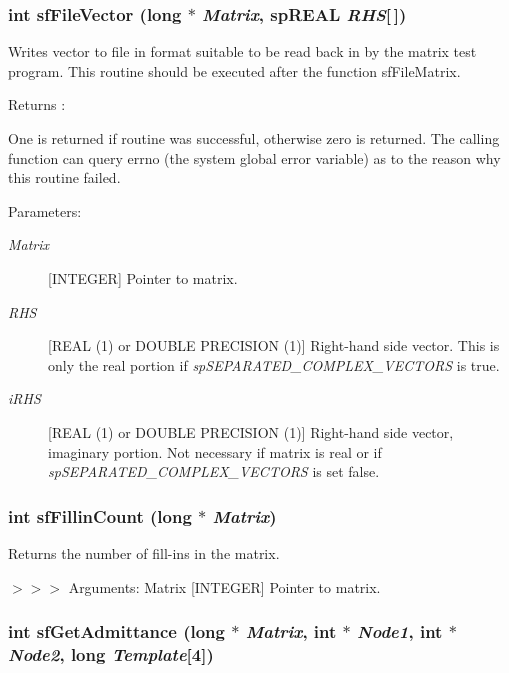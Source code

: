 \subsubsection{\setlength{\rightskip}{0pt plus 5cm}int sf\-File\-Vector (long $\ast$ {\em Matrix}, sp\-REAL {\em RHS}[$\,$])}\label{spFortran_8c_a68}


Writes vector to file in format suitable to be read back in by the matrix test program. This routine should be executed after the function sf\-File\-Matrix.

\begin{Desc}
\item[Returns :]\par
 One is returned if routine was successful, otherwise zero is returned. The calling function can query errno (the system global error variable) as to the reason why this routine failed.\end{Desc}
\begin{Desc}
\item[Parameters: ]\par
\begin{description}
\item[{\em 
Matrix}][INTEGER] Pointer to matrix. \item[{\em 
RHS}][REAL (1) or DOUBLE PRECISION (1)] Right-hand side vector. This is only the real portion if {\em sp\-SEPARATED\_\-COMPLEX\_\-VECTORS} is true. \item[{\em 
i\-RHS}][REAL (1) or DOUBLE PRECISION (1)] Right-hand side vector, imaginary portion. Not necessary if matrix is real or if {\em sp\-SEPARATED\_\-COMPLEX\_\-VECTORS} is set false. \end{description}
\end{Desc}
\subsubsection{\setlength{\rightskip}{0pt plus 5cm}int sf\-Fillin\-Count (long $\ast$ {\em Matrix})}\label{spFortran_8c_a81}


Returns the number of fill-ins in the matrix.

$>$$>$$>$ Arguments: Matrix [INTEGER] Pointer to matrix. 
\subsubsection{\setlength{\rightskip}{0pt plus 5cm}int sf\-Get\-Admittance (long $\ast$ {\em Matrix}, int $\ast$ {\em Node1}, int $\ast$ {\em Node2}, long {\em Template}[4])}\label{spFortran_8c_a52}



